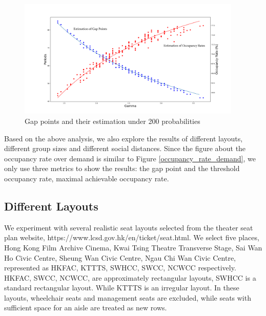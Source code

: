\begin{figure}[ht]
  \centering
    \includegraphics[width=0.95\textwidth]{./Figures/esti_scatter.pdf}
  \caption{Gap points and their estimation under 200 probabilities}
\end{figure}


Based on the above analysis, we also explore the results of different layouts, different group sizes and different social distances. Since the figure about the occupancy rate over demand is similar to Figure \ref{occupancy_rate_demand}, we only use three metrics to show the results: the gap point and the threshold occupancy rate, maximal achievable occupancy rate.

\subsection*{Different Layouts}
We experiment with several realistic seat layouts selected from the theater seat plan website, https://www.lcsd.gov.hk/en/ticket/seat.html. We select five places, Hong Kong Film Archive Cinema, Kwai Tsing Theatre Transverse Stage, Sai Wan Ho Civic Centre, Sheung Wan Civic Centre, Ngau Chi Wan Civic Centre, represented as HKFAC, KTTTS, SWHCC, SWCC, NCWCC respectively. HKFAC, SWCC, NCWCC, are approximately rectangular layouts, SWHCC is a standard rectangular layout. While KTTTS is an irregular layout. In these layouts, wheelchair seats and management seats are excluded, while seats with sufficient space for an aisle are treated as new rows. 

